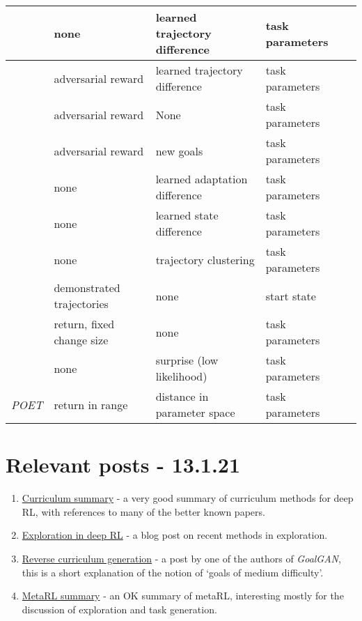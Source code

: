\documentclass[letterpaper]{article}
\theoremstyle{definition}
\begin{document}
\begin{table*}
\begin{tabular}{|l | l | l | l  | l|}
	\cite{Mehta2019} & none & learned trajectory difference & task parameters \\ \hline
	\cite{Raparthy2020} & adversarial reward & learned trajectory difference & task parameters \\ \hline
	\cite{Sukhbaatar2017} & adversarial reward & None & task parameters \\ \hline
	\cite{OpenAI2021} & adversarial reward & new goals & task parameters \\ \hline
	\cite{Mehta2020} & none & learned adaptation difference & task parameters \\ \hline
	\cite{Gupta2018} & none & learned state difference & task parameters \\ \hline
	\cite{Jabri2019} & none & trajectory clustering & task parameters \\ \hline
	\cite{Srinivasan2019} & demonstrated trajectories & none & start state \\ \hline
	\cite{Akkaya2019} & return, fixed change size & none & task parameters \\ \hline
	\cite{Kaddour2020} & none & surprise (low likelihood) & task parameters \\ \hline
	\textit{POET} \cite{Wang2019} & return in range & distance in parameter space & task parameters \\ \hline
\end{tabular}
\end{table*}

\section{Relevant posts - 13.1.21} \label{sec:blogs}

\begin{enumerate}
	\item 
	\href{https://lilianweng.github.io/lil-log/2020/01/29/curriculum-for-reinforcement-learning.html}{Curriculum summary} - a very good summary of curriculum methods for deep RL, with references to many of the better known papers.
	
	\item \href{https://lilianweng.github.io/lil-log/2020/06/07/exploration-strategies-in-deep-reinforcement-learning.html}{Exploration in deep RL} - a blog post on recent methods in exploration.
	
	\item 
	\href{https://bair.berkeley.edu/blog/2017/12/20/reverse-curriculum/}{Reverse curriculum generation} - a post by one of the authors of \textit{GoalGAN}, this is a short explanation of the notion of `goals of medium difficulty'.
	
	\item 
	\href{https://lilianweng.github.io/lil-log/2019/06/23/meta-reinforcement-learning.html}{MetaRL summary} - an OK summary of metaRL, interesting mostly for the discussion of exploration and task generation.

\end{enumerate}
\end{document}
